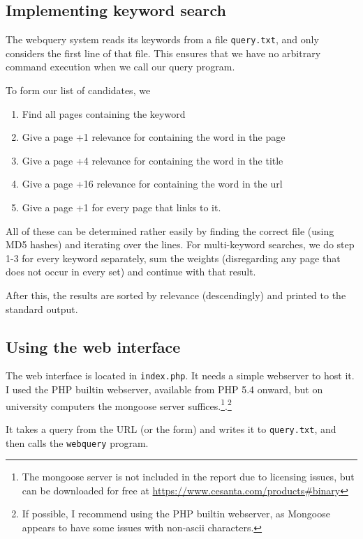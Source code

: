 \documentclass[12pt,a4paper]{article}
\begin{document}
\subsection{Implementing keyword search}

The webquery system reads its keywords from a file \texttt{query.txt}, and only considers the first line of that file. This ensures that we have no arbitrary command execution when we call our query program.

To form our list of candidates, we

\begin{enumerate}
	\item Find all pages containing the keyword
	\item Give a page +1 relevance for containing the word in the page
	\item Give a page +4 relevance for containing the word in the title
	\item Give a page +16 relevance for containing the word in the url
	\item Give a page +1 for every page that links to it.
\end{enumerate}

All of these can be determined rather easily by finding the correct file (using MD5 hashes) and iterating over the lines. For multi-keyword searches, we do step 1-3 for every keyword separately, sum the weights (disregarding any page that does not occur in every set) and continue with that result.

After this, the results are sorted by relevance (descendingly) and printed to the standard output.

\subsection{Using the web interface}

The web interface is located in \texttt{index.php}. It needs a simple webserver to host it. I used the PHP builtin webserver, available from PHP 5.4 onward, but on university computers the mongoose server suffices.\footnote{The mongoose server is not included in the report due to licensing issues, but can be downloaded for free at \url{https://www.cesanta.com/products\#binary}}.\footnote{If possible, I recommend using the PHP builtin webserver, as Mongoose appears to have some issues with non-ascii characters.}

It takes a query from the URL (or the form) and writes it to \texttt{query.txt}, and then calls the \texttt{webquery} program.
\end{document}
